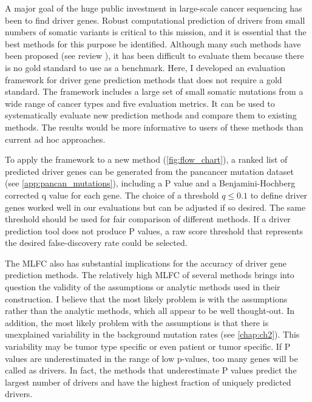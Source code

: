A major goal of the huge public investment in large-scale cancer sequencing has been to find driver genes. Robust computational prediction of drivers from small numbers of somatic variants is critical to this mission, and it is essential that the best methods for this purpose be identified. Although many such methods have been proposed (see review \cite{RN49}), it has been difficult to evaluate them because there is no gold standard to use as a benchmark. Here, I developed an evaluation framework for driver gene prediction methods that does not require a gold standard. The framework includes a large set of small somatic mutations from a wide range of cancer types and five evaluation metrics. It can be used to systematically evaluate new prediction methods and compare them to existing methods. The results would be more informative to users of these methods than current ad hoc approaches.

To apply the framework to a new method (\autoref{fig:flow_chart}), a ranked list of predicted driver genes can be generated from the pancancer mutation dataset (see \autoref{app:pancan_mutations}), including a P value and a Benjamini-Hochberg corrected q value for each gene. The choice of a threshold $q \leq 0.1$ to define driver genes worked well in our evaluations but can be adjusted if so desired. The same threshold should be used for fair comparison of different methods. If a driver prediction tool does not produce P values, a raw score threshold that represents the desired false-discovery rate could be selected.

The MLFC also has substantial implications for the accuracy of driver gene prediction methods. The relatively high MLFC of several methods brings into question the validity of the assumptions or analytic methods used in their construction. I believe that the most likely problem is with the assumptions rather than the analytic methods, which all appear to be well thought-out. In addition, the most likely problem with the assumptions is that there is unexplained variability in the background mutation rates (see \autoref{chap:ch2}). This variability may be tumor type specific or even patient or tumor specific. If P values are underestimated in the range of low p-values, too many genes will be called as drivers. In fact, the methods that underestimate P values predict the largest number of drivers and have the highest fraction of uniquely predicted drivers.


